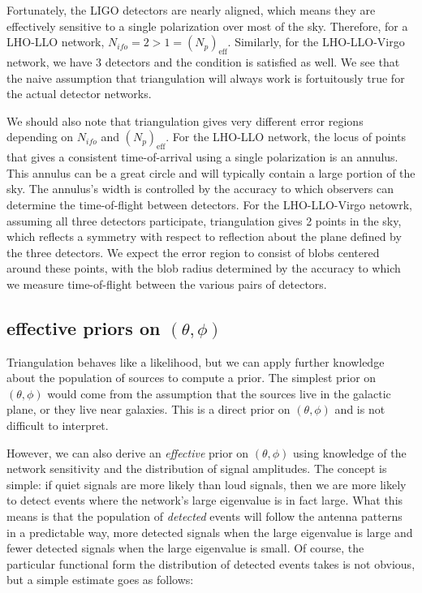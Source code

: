 \documentclass[10pt]{article}
\begin{document}
Fortunately, the LIGO detectors are nearly aligned, which means they are effectively sensitive to a single polarization over most of the sky. Therefore, for a LHO-LLO network, $N_{ifo}=2 > 1=\left(N_p\right)_{\mathrm{eff}}$. Similarly, for the LHO-LLO-Virgo network, we have 3 detectors and the condition is satisfied as well. We see that the naive assumption that triangulation will always work is fortuitously true for the actual detector networks.

We should also note that triangulation gives very different error regions depending on $N_{ifo}$ and $\left(N_{p}\right)_{\mathrm{eff}}$. For the LHO-LLO network, the locus of points that gives a consistent time-of-arrival using a single polarization is an annulus. This annulus can be a great circle and will typically contain a large portion of the sky. The annulus's width is controlled by the accuracy to which observers can determine the time-of-flight between detectors. For the LHO-LLO-Virgo netowrk, assuming all three detectors participate, triangulation gives 2 points in the sky, which reflects a symmetry with respect to reflection about the plane defined by the three detectors. We expect the error region to consist of blobs centered around these points, with the blob radius determined by the accuracy to which we measure time-of-flight between the various pairs of detectors.

\subsection{effective priors on $(\theta,\phi)$}

Triangulation behaves like a likelihood, but we can apply further knowledge about the population of sources to compute a prior. The simplest prior on $(\theta,\phi)$ would come from the assumption that the sources live in the galactic plane, or they live near galaxies. This is a direct prior on $(\theta,\phi)$ and is not difficult to interpret.

However, we can also derive an \emph{effective} prior on $(\theta,\phi)$ using knowledge of the network sensitivity and the distribution of signal amplitudes. The concept is simple: if quiet signals are more likely than loud signals, then we are more likely to detect events where the network's large eigenvalue is in fact large. What this means is that the population of \emph{detected} events will follow the antenna patterns in a predictable way, more detected signals when the large eigenvalue is large and fewer detected signals when the large eigenvalue is small. Of course, the particular functional form the distribution of detected events takes is not obvious, but a simple estimate goes as follows:
\end{document}

